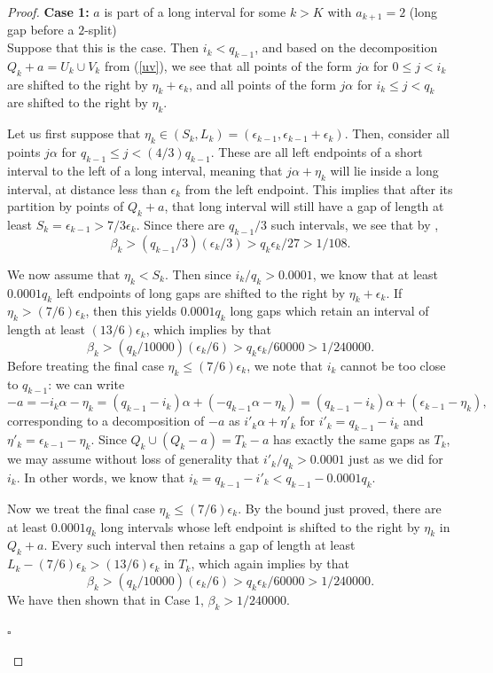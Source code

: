 \documentclass[11pt,reqno]{amsart}
\theoremstyle{definition}
\theoremstyle{plain}
\begin{document}
\begin{proof}
\noindent
\textbf{Case 1:} $a$ is part of a long interval for some $k > K$ with $a_{k+1} = 2$ (long gap before a $2$-split)\\

Suppose that this is the case. Then $i_k < q_{k-1}$, and based on the decomposition $Q_k + a = U_k \cup V_k$ from (\ref{uv}),
we see that all points of the form $j\alpha$ for $0 \leq j < i_k$ are shifted to the right by $\eta_k + \epsilon_k$, and all points of the form $j\alpha$ for $i_k \leq j < q_{k}$ are shifted to the right by $\eta_k$. %

Let us first suppose that $\eta_k \in (S_k, L_k) = (\epsilon_{k-1}, \epsilon_{k-1} + \epsilon_k)$. Then, consider all points $j\alpha$ for $q_{k-1} \leq j < (4/3)q_{k-1}$. These are all left endpoints of a short interval to the left of a long interval, meaning that $j\alpha + \eta_k$ will lie inside a long interval, at distance less than $\epsilon_k$ from the left endpoint. This implies that after its partition by points of $Q_k + a$, that long interval will still have a gap of length at least $S_k = \epsilon_{k-1} > 7/3 \epsilon_k$. Since there are $q_{k-1}/3$ such intervals, we see that by ,
\[
\beta_k > (q_{k-1}/3)(\epsilon_k/3) > q_k \epsilon_k/27 > 1/108.
\]

We now assume that $\eta_k < S_k$. Then since $i_k/q_k > 0.0001$, we know that at least $0.0001q_k$ left endpoints of long gaps are shifted to the right by $\eta_k + \epsilon_k$. If $\eta_k > (7/6) \epsilon_k$, then this yields $0.0001q_k$ long gaps which retain an interval of length at least $(13/6) \epsilon_k$, which implies by  that
\[
\beta_k > (q_k/10000)(\epsilon_k/6) > q_k \epsilon_k/60000 > 1/240000.
\]
Before treating the final case $\eta_k \leq (7/6) \epsilon_k$, we note that $i_k$ cannot be too close to $q_{k-1}$: we can write
\[
-a = -i_k \alpha - \eta_k = (q_{k-1} - i_k) \alpha + (-q_{k-1} \alpha - \eta_k) = (q_{k-1} - i_k)\alpha + (\epsilon_{k-1} - \eta_k),
\]
corresponding to a decomposition of $-a$ as $i'_k \alpha + \eta'_k$ for $i'_k = q_{k-1} - i_k$ and 
$\eta'_k = \epsilon_{k-1} - \eta_k$. Since $Q_k \cup (Q_k - a) = T_k - a$ has exactly the same gaps as $T_k$, we may assume without loss of generality that $i'_k/q_k > 0.0001$ just as we did for $i_k$. In other words, we know that $i_k = q_{k-1} - i'_k < q_{k-1} - 0.0001q_k$. 

Now we treat the final case $\eta_k \leq (7/6) \epsilon_k$. By the bound just proved, there are at least $0.0001 q_k$ long intervals whose left endpoint is shifted to the right by $\eta_k$ in $Q_k + a$. Every such interval then retains a gap of length at least $L_k - (7/6)\epsilon_k > (13/6) \epsilon_k$ in $T_k$, which again implies by  that
\[
\beta_k > (q_k/10000)(\epsilon_k/6) > q_k \epsilon_k/60000 > 1/240000.
\]
We have then shown that in Case 1, $\beta_k > 1/240000$. 
\begin{flushright}
    $\square$\\
\end{flushright}


\end{proof}
\end{document}

